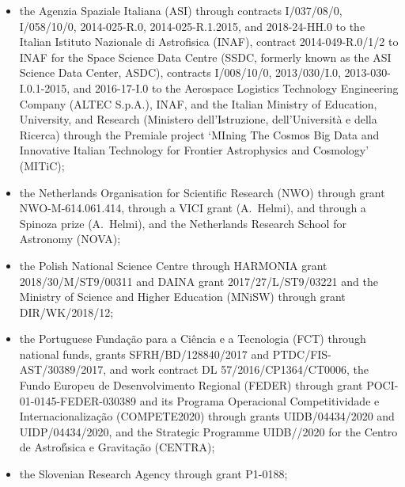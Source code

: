 \documentclass{aa}
\begin{document}
\begin{appendix}
\begin{itemize}
\item the Agenzia Spaziale Italiana (ASI) through contracts I/037/08/0, I/058/10/0, 2014-025-R.0, 2014-025-R.1.2015, and 2018-24-HH.0 to the Italian Istituto Nazionale di Astrofisica (INAF), contract 2014-049-R.0/1/2 to INAF for the Space Science Data Centre (SSDC, formerly known as the ASI Science Data Center, ASDC), contracts I/008/10/0, 2013/030/I.0, 2013-030-I.0.1-2015, and 2016-17-I.0 to the Aerospace Logistics Technology Engineering Company (ALTEC S.p.A.), INAF, and the Italian Ministry of Education, University, and Research (Ministero dell'Istruzione, dell'Universit\`{a} e della Ricerca) through the Premiale project `MIning The Cosmos Big Data and Innovative Italian Technology for Frontier Astrophysics and Cosmology' (MITiC);
\item the Netherlands Organisation for Scientific Research (NWO) through grant NWO-M-614.061.414, through a VICI grant (A.~Helmi), and through a Spinoza prize (A.~Helmi), and the Netherlands Research School for Astronomy (NOVA);
\item the Polish National Science Centre through HARMONIA grant 2018/30/M/ST9/00311 and DAINA grant 2017/27/L/ST9/03221 and the Ministry of Science and Higher Education (MNiSW) through grant DIR/WK/2018/12;
\item the Portuguese Funda\c{c}\~{a}o para a Ci\^{e}ncia e a Tecnologia (FCT) through national funds, grants SFRH/\-BD/128840/2017 and PTDC/FIS-AST/30389/2017, and work contract DL 57/2016/CP1364/CT0006, the Fundo Europeu de Desenvolvimento Regional (FEDER) through grant POCI-01-0145-FEDER-030389 and its Programa Operacional Competitividade e Internacionaliza\c{c}\~{a}o (COMPETE2020) through grants UIDB/04434/2020 and UIDP/04434/2020, and the Strategic Programme UIDB//2020 for the Centro de Astrof\'{\i}sica e Gravita\c{c}\~{a}o (CENTRA);  
\item the Slovenian Research Agency through grant P1-0188;

\end{itemize}
\end{appendix}
\end{document}
